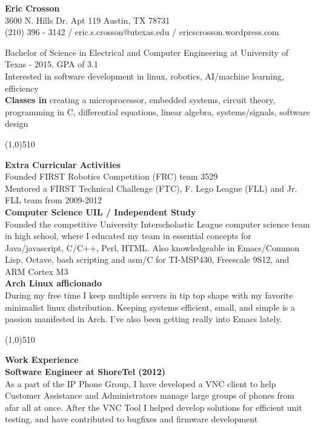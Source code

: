 \documentclass{report}
\begin{document}
\pagestyle{empty}
\setlength\parindent{0pt}

\begin{center}
\textbf{Eric Crosson} \\
3600 N. Hills Dr. Apt 119 Austin, TX 78731 \\
(210) 396 - 3142 / eric.s.crosson@utexas.edu / ericscrosson.wordpress.com\\
\end{center}

Bachelor of Science in Electrical and Computer Engineering at University of Texas - 2015. GPA of 3.1 \\
Interested in software development in linux, robotics, AI/machine
learning, efficiency \\

\textbf{Classes in}
creating a microprocessor, embedded systems, circuit theory,
programming in C, differential equations, linear algebra, systems/signals, software design

\begin{center}
\line(1,0){510}
\end{center}

\textbf{Extra Curricular Activities} \\
Founded FIRST Robotics Competition (FRC) team 3529 \\
Mentored a FIRST Technical Challenge (FTC), F. Lego League (FLL) and
Jr. FLL team from 2009-2012 \\

\textbf{Computer Science UIL / Independent Study} \\
Founded the competitive University Interscholastic League computer science team in high school, where I educated my team in essential concepts for Java/javascript, C/C++, Perl, HTML. Also knowledgeable in Emacs/Common Lisp, Octave, bash scripting and asm/C for TI-MSP430, Freescale 9S12, and ARM Cortex M3 \\

\textbf{Arch Linux afficionado} \\
During my free time I keep multiple servers in tip top shape with my favorite minimalist linux distribution. Keeping systems efficient, small, and simple is a passion manifested in Arch. I've also been getting really into Emacs lately.

\begin{center}
\line(1,0){510}
\end{center}

\textbf{Work Experience} \\
\textbf{Software Engineer at ShoreTel (2012)} \\
As a part of the IP Phone Group, I have developed a VNC client to help Customer Assistance and Administrators manage large groups of phones from afar all at once. After the VNC Tool I helped develop solutions for efficient unit testing, and have contributed to bugfixes and firmware development \\
\end{document}
